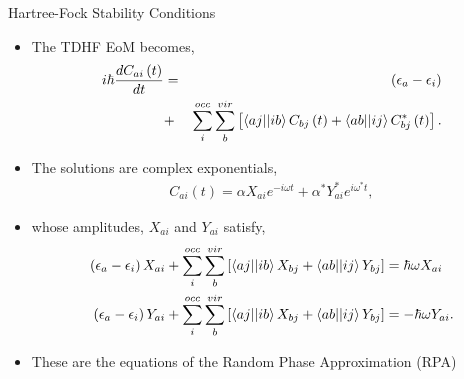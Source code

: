 \documentclass[10pt]{beamer}
\begin{document}
{{{{{\begin{frame}{Hartree-Fock Stability Conditions}
	\begin{itemize}[<+->]
		\item[]{The TDHF EoM becomes,
			\begin{eqnarray}
				i\hbar \frac{dC_{ai} \left(t\right) }{dt} &=& \left(\epsilon_a - \epsilon_i \right) \nonumber
					\\ &+& \sum\limits_{i}^{occ}  \sum\limits_{b}^{vir} 
					  \left[\braket{aj||ib}C_{bj}   \left( t \right)
						  +\braket{ab||ij}C_{bj}^* \left( t \right) \right]. 
			\end{eqnarray}
		}
		\item[]{The solutions are complex exponentials,
			\begin{eqnarray}
				C_{ai} \left(t \right)  = \alpha X_{ai} e^{-i \omega t} + \alpha^* Y_{ai}^* e^{i \omega^* t},
			\end{eqnarray}
		}
		\item[]{whose amplitudes, $X_{ai}$ and $Y_{ai}$ satisfy,
			\begin{align}
				\left(\epsilon_a - \epsilon_i \right)X_{ai} + \sum\limits_{i}^{occ}  \sum\limits_{b}^{vir} 
					\left[ \braket{aj||ib}X_{bj} + \braket{ab||ij}Y_{bj} \right] &= \hbar \omega X_{ai}
				\nonumber \\
				\left(\epsilon_a - \epsilon_i \right)Y_{ai} + \sum\limits_{i}^{occ}  \sum\limits_{b}^{vir}
					\left[ \braket{aj||ib}X_{bj} + \braket{ab||ij}Y_{bj} \right] &= -\hbar \omega Y_{ai}.
			\end{align}
		}
		\item[]{These are the equations of the Random Phase Approximation (RPA)}		
	\end{itemize}
\end{frame}

{%

}}}}}}
\end{document}
